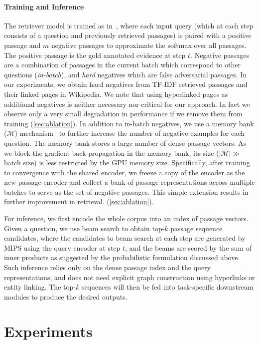 \paragraph{Training and Inference} The retriever model is trained as in~\citet{DPR}, where each input query (which at each step consists of a question and previously retrieved passages) is paired with a positive passage and $m$ negative passages to approximate the softmax over all passages.  The positive passage is the gold annotated evidence at step $t$.  Negative passages are a combination of passages in the current batch which correspond to other questions (\emph{in-batch}), and \emph{hard} negatives which are false adversarial passages.  In our experiments, we obtain hard negatives from TF-IDF retrieved passages and their linked pages in Wikipedia.  We note that using hyperlinked pages as additional negatives is neither necessary nor critical for our approach.  In fact we observe only a very small degradation in performance if we remove them from training (\cref{sec:ablation}). In addition to in-batch negatives, we use a memory bank ($\mathcal{M}$) mechanism~\citep{MemoryBank} to further increase the number of negative examples for each question. The memory bank stores a large number of dense passage vectors. As we block the gradient back-propagation in the memory bank, its size ($|\mathcal{M}| \gg$ batch size) is less restricted by the GPU memory size. Specifically, after training to convergence with the shared encoder, we freeze a copy of the encoder as the new passage encoder and collect a bank of passage representations across multiple batches to serve as the set of negative passages. This simple extension results in further improvement in retrieval. (\cref{sec:ablation}).

For inference, we first encode the whole corpus into an index of passage vectors. Given a question, we use beam search to obtain top-$k$ passage sequence candidates, where the candidates to beam search at each step are generated by MIPS using the query encoder at step $t$, and 
the beams are scored by the sum of inner products
as suggested by the probabilistic formulation discussed above.  Such inference relies only on the dense passage index and the query representations, and does not need explicit graph construction using hyperlinks or entity linking. The top-$k$ sequences will then be fed into task-specific downstream modules to produce the desired outputs. 

\section{Experiments} 
\label{sec:task}

